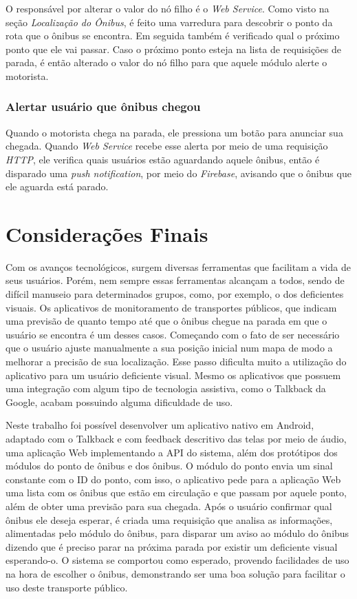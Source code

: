 \documentclass[
	12pt,				%
	oneside,			%
	a4paper,			%
	brazil				%
]{abntex2}
\begin{document}
O responsável por alterar o valor do nó filho é o \textit{Web Service}. Como visto na seção \textit{Localização do Ônibus}, é feito uma varredura para descobrir o ponto da rota que o ônibus se encontra. Em seguida também é verificado qual o próximo ponto que ele vai passar. Caso o próximo ponto esteja na lista de requisições de parada, é então alterado o valor do nó filho para que aquele módulo alerte o motorista.

\subsection{Alertar usuário que ônibus chegou}

Quando o motorista chega na parada, ele pressiona um botão para anunciar sua chegada. Quando \textit{Web Service} recebe esse alerta por meio de uma requisição \textit{HTTP}, ele verifica quais usuários estão aguardando aquele ônibus, então é disparado uma \textit{push notification}, por meio do \textit{Firebase}, avisando que o ônibus que ele aguarda está parado.

\chapter{Considerações Finais}

Com os avanços tecnológicos, surgem diversas ferramentas que facilitam a vida de seus usuários. Porém, nem sempre essas ferramentas alcançam a todos, sendo de difícil manuseio para determinados grupos, como, por exemplo, o dos deficientes visuais. Os aplicativos de monitoramento de transportes públicos, que indicam uma previsão de quanto tempo até que o ônibus chegue na parada em que o usuário se encontra é um desses casos. Começando com o fato de ser necessário que o usuário ajuste manualmente a sua posição inicial num mapa de modo a melhorar a precisão de sua localização. Esse passo dificulta muito a utilização do aplicativo para um usuário deficiente visual. Mesmo os aplicativos que possuem uma integração com algum tipo de tecnologia assistiva, como o Talkback da Google, acabam possuindo alguma dificuldade de uso.

Neste trabalho foi possível desenvolver um aplicativo nativo em Android, adaptado com o Talkback e com feedback descritivo das telas por meio de áudio, uma aplicação Web implementando a API do sistema, além dos protótipos dos módulos do ponto de ônibus e dos ônibus. O módulo do ponto envia um sinal constante com o ID do ponto, com isso, o aplicativo pede para a aplicação Web uma lista com os ônibus que estão em circulação e que passam por aquele ponto, além de obter uma previsão para sua chegada. Após o usuário confirmar qual ônibus ele deseja esperar, é criada uma requisição que analisa as informações, alimentadas pelo módulo do ônibus, para disparar um aviso ao módulo do ônibus dizendo que é preciso parar na próxima parada por existir um deficiente visual esperando-o. O sistema se comportou como esperado, provendo facilidades de uso na hora de escolher o ônibus, demonstrando ser uma boa solução para facilitar o uso deste transporte público.
\end{document}
